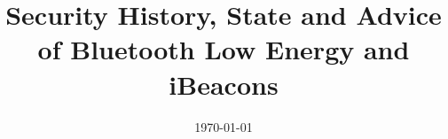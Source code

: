 \documentclass{uva-inf-article}
\title{Security History, State and Advice of Bluetooth Low Energy and iBeacons}
\date{\today}
\begin{document}
\maketitle

\newpage

%
\begin{multicols}{2}




\end{multicols}

\printbibliography{}

%
 
\end{document}
